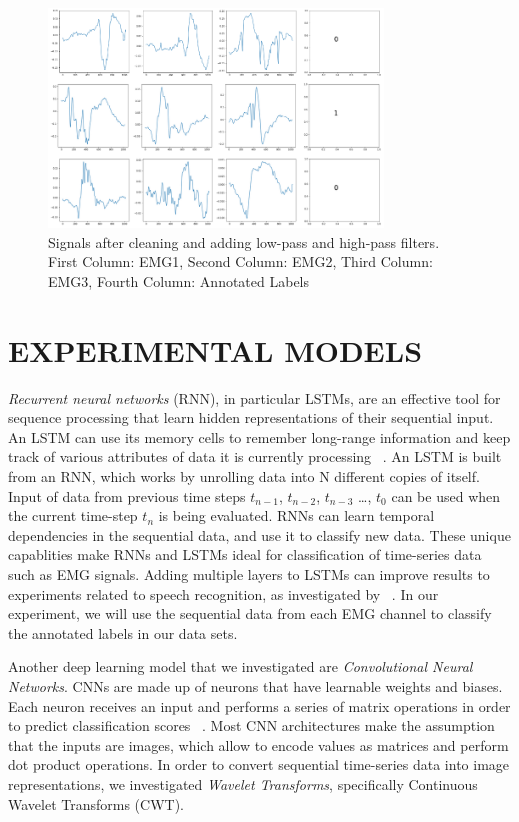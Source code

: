 \documentclass{article}
\begin{document}
\begin{figure}[!t]
\centering
\includegraphics[width=3.5in]{images/cleaned_signals.png}
\caption{Signals after cleaning and adding low-pass and high-pass filters. First Column: EMG1, Second Column: EMG2, Third Column: EMG3, Fourth Column: Annotated Labels}
\label{fig: cleaned_signals}
\end{figure}

\section{EXPERIMENTAL MODELS}
\label{sec:EXPERIMENTAL MODELS}
\textit{Recurrent neural networks} (RNN), in particular LSTMs, are an effective tool for sequence processing that learn hidden representations of their sequential input. An LSTM can use its memory cells to remember long-range information and keep track of various attributes of data it is currently processing ~\cite{karpathy_visualizing_2016}. An LSTM is built from an RNN, which works by unrolling data into N different copies of itself. Input of data from previous time steps $t_{n-1}$, $t_{n-2}$, $t_{n-3}$ \ldots, $t_{0}$ can be used when the current time-step $t_{n}$ is being evaluated. RNNs can learn temporal dependencies in the sequential data, and use it to classify new data. These unique capablities make RNNs and LSTMs ideal for classification of time-series data such as EMG signals. Adding multiple layers to LSTMs can improve results to experiments related to speech recognition, as investigated by ~\cite{graves_speech_2013}. In our experiment, we will use the sequential data from each EMG channel to classify the annotated labels in our data sets.

Another deep learning model that we investigated are \textit{Convolutional Neural Networks}. CNNs are made up of neurons that have learnable weights and biases. Each neuron receives an input and performs a series of matrix operations in order to predict classification scores ~\cite{noauthor_cs231n_nodate}. Most CNN architectures make the assumption that the inputs are images, which allow to encode values as matrices and perform dot product operations.  In order to convert sequential time-series data into image representations, we investigated \textit{Wavelet Transforms}, specifically Continuous Wavelet Transforms (CWT).
\end{document}
